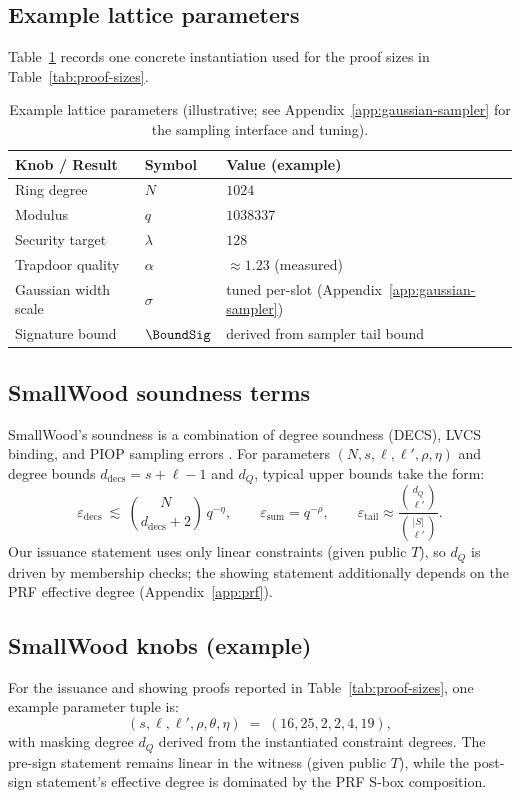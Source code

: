 \subsection{Example lattice parameters}
Table~\ref{tab:lattice-params} records one concrete instantiation used for the proof sizes in
Table~\ref{tab:proof-sizes}.

\begin{table}[H]
\centering
\renewcommand{\arraystretch}{1.15}
\begin{tabular}{@{}lll@{}}
\toprule
\textbf{Knob / Result} & \textbf{Symbol} & \textbf{Value (example)} \\
\midrule
Ring degree & \(N\) & \(1024\) \\
Modulus & \(q\) & \(1038337\) \\
Security target & \(\lambda\) & \(128\) \\
\midrule
Trapdoor quality & \(\alpha\) & \(\approx 1.23\) (measured) \\
Gaussian width scale & \(\sigma\) & tuned per-slot (Appendix~\ref{app:gaussian-sampler}) \\
Signature bound & \(\BoundSig\) & derived from sampler tail bound \\
\bottomrule
\end{tabular}
\caption{Example lattice parameters (illustrative; see Appendix~\ref{app:gaussian-sampler} for the sampling interface and
tuning).}
\label{tab:lattice-params}
\end{table}

\subsection{SmallWood soundness terms}
SmallWood’s soundness is a combination of degree soundness (DECS), LVCS binding, and PIOP sampling errors
\cite{EPRINT:FenRiv25b}. For parameters \((N,s,\ell,\ell',\rho,\eta)\) and degree bounds \(d_{\mathrm{decs}}=s+\ell-1\)
and \(d_Q\), typical upper bounds take the form:
\[
\varepsilon_{\mathrm{decs}}\ \lesssim\ \binom{N}{d_{\mathrm{decs}}+2}\,q^{-\eta},
\qquad
\varepsilon_{\mathrm{sum}} = q^{-\rho},
\qquad
\varepsilon_{\mathrm{tail}} \approx \frac{\binom{d_Q}{\ell'}}{\binom{|S|}{\ell'}}.
\]
Our issuance statement uses only linear constraints (given public \(T\)), so \(d_Q\) is driven by membership checks; the
showing statement additionally depends on the PRF effective degree (Appendix~\ref{app:prf}).

\subsection{SmallWood knobs (example)}
For the issuance and showing proofs reported in Table~\ref{tab:proof-sizes}, one example parameter tuple is:
\[
  (s,\ell,\ell',\rho,\theta,\eta)\;=\;(16,25,2,2,4,19),
\]
with masking degree \(d_Q\) derived from the instantiated constraint degrees. The pre-sign statement remains linear in
the witness (given public \(T\)), while the post-sign statement’s effective degree is dominated by the PRF S-box
composition.

